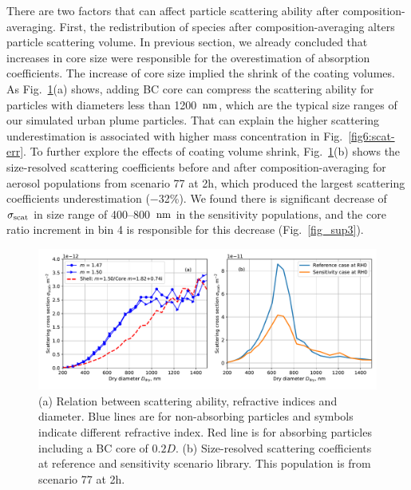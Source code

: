 \documentclass[edeposit,fullpage]{uiucthesis2009}
\makeatletter
\DeclareRobustCommand*\unit[1]
 {\ensuremath{%
   {\thinmuskip3mu\relax
    \def\mu{\text{\textmu}}\def~{\,}%
    \ifx\f@series\testbx\mathbf{#1}\else\mathrm{#1}\fi}}}
\makeatother
\begin{document}
There are two factors that can affect particle scattering ability after 
composition-averaging. First, the redistribution of species after composition-averaging 
alters particle scattering volume. In previous section, we already concluded 
that increases in core size were responsible for the overestimation of absorption coefficients.
The increase of core size implied the shrink of the coating volumes. As Fig.~\ref{fig8:scat-exp}(a) shows, 
adding BC core can compress the scattering ability for particles with diameters less than 1200~\unit{nm}, which 
are the typical size ranges of our simulated urban plume particles. That can explain the higher scattering underestimation
is associated with higher mass concentration in Fig.~\ref{fig6:scat-err}. To further explore the effects of coating volume shrink, Fig.~\ref{fig8:scat-exp}(b) shows the size-resolved scattering coefficients before and after composition-averaging for aerosol populations from scenario 77 at 2h, which produced the largest scattering coefficients underestimation ($-$32\%). We found there is significant decrease of $\sigma_{\rm scat}$ in size range of 400--800~\unit{nm} 
in the sensitivity populations, and the core ratio increment in bin 4 is responsible for this decrease (Fig.~\ref{fig_sup3}). 

\begin{figure}
	\centering
	\includegraphics[scale=0.50]{chap4_figs/fig7.pdf}
	\caption{(a) Relation between scattering ability, refractive
          indices and diameter. Blue lines are for non-absorbing
          particles and symbols indicate different refractive
          index. Red line is for absorbing particles including a BC
          core of $0.2D$. (b) Size-resolved scattering coefficients at reference and sensitivity scenario library.
          This population is from scenario 77 at 2h.}
	\label{fig8:scat-exp}
\end{figure}
\end{document}
